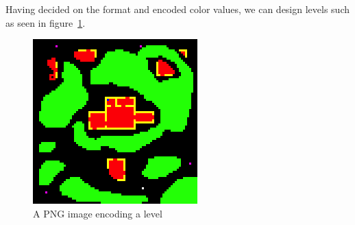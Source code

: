 Having decided on the format and encoded color values, we can design levels
such as seen in figure~\ref{fig:png_map}.

\begin{figure}[H]
    \centering
    \includegraphics{figures/generating_levels/map.png}
    \caption{A PNG image encoding a level}
    \label{fig:png_map}
\end{figure}

